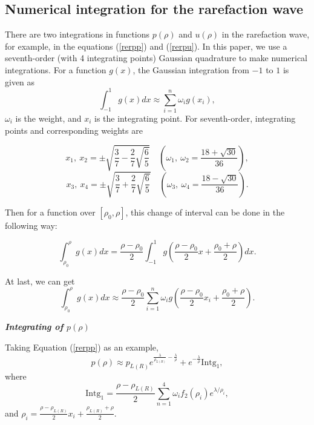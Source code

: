 \documentclass{article}
\numberwithin{equation}{section}
\numberwithin{table}{section}
\begin{document}
  \appendix
  \begin{appendices}

  \renewcommand{\appendixname}{Appendix\Alph{section}}

  \section{Numerical integration for the rarefaction wave}
  There are two integrations in  functions $p(\rho)$ and $u(\rho)$ in the rarefaction wave, for example,  in the equations (\ref{rerpp}) and (\ref{rerpu}).  In this paper, we use  a seventh-order (with 4 integrating points) Gaussian quadrature to make numerical integrations.
For a function $g(x)$,  the Gaussian integration from $-1$ to $1$ is given as
$$
\int_{-1}^1 g(x)dx \approx \sum_{i=1}^n \omega_i g(x_i),
$$
$\omega_i$ is the weight, and $x_i$ is the integrating point.
For seventh-order,  integrating points  and  corresponding weights are

$$x_1, \ x_2 =\pm \sqrt{\frac{3}{7} -\frac{2}{7}\sqrt{\frac{6}{5}}} \quad \left(\omega_1, \  \omega_2 =\frac{18+\sqrt{30}}{36} \right), $$
$$x_3, \ x_4 =\pm \sqrt{\frac{3}{7} +\frac{2}{7}\sqrt{\frac{6}{5}}} \quad \left(\omega_3, \  \omega_4 =\frac{18-\sqrt{30}}{36} \right). $$

Then for a function over $[\rho_0, \rho]$, this change of  interval can be done  in the following way:

$$
\int_{\rho_0}^{\rho}g(x) dx= \frac{\rho-\rho_0}{2}\int_{-1}^{1} g\left(\frac{\rho-\rho_0}{2}x+\frac{\rho_0+\rho}{2}\right)dx .
 $$

At last, we can get
\begin{equation}\label{int1}
  \int_{\rho_0}^{\rho}g(x) dx \approx \frac{\rho-\rho_0}{2}\sum_{i=1}^n \omega_i g\left(\frac{\rho-\rho_0}{2}x_{i}+\frac{\rho_0+\rho}{2}\right).
\end{equation}


 \emph{\textbf{Integrating of $p(\rho)$}}

 Taking Equation (\ref{rerpp}) as an example,
 \begin{equation} \label{eq:app}
  p(\rho) \approx
  p_{L(R)}e^{\frac{\lambda}{\rho_{L(R)}}-\frac{\lambda}{\rho}} +e^{-\frac{\lambda}{\rho}} \text{Intg}_1, %
\end{equation}
where
$$\text{Intg}_1 = \frac{\rho - \rho_{L(R)}}{2} \sum_{n=1}^4 \omega_i f_2(\rho_i) e^{\lambda/\rho_i},$$
and $\rho_i =  \frac{\rho-\rho_{L(R)}}{2}x_i+\frac{\rho_{L(R)}+\rho}{2} $.


\end{appendices}
\end{document}
